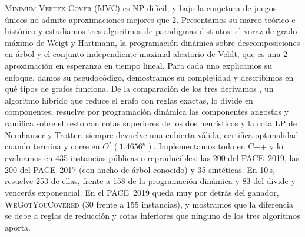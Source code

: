 \textsc{Minimum Vertex Cover} (MVC) es NP-difícil, y bajo la conjetura de juegos únicos no admite aproximaciones mejores que $2$. Presentamos su marco teórico e histórico y estudiamos tres algoritmos de paradigmas distintos: el voraz de grado máximo de Weigt y Hartmann, la programación dinámica sobre descomposiciones en árbol y el conjunto independiente maximal aleatorio de Veldt, que es una $2$-aproximación en esperanza en tiempo lineal. Para cada uno explicamos su enfoque, damos su pseudocódigo, demostramos su complejidad y describimos en qué tipos de grafos funciona. De la comparación de los tres derivamos \hyvc, un algoritmo híbrido que reduce el grafo con reglas exactas, lo divide en componentes, resuelve por programación dinámica las componentes angostas y ramifica sobre el resto con cotas superiores de los dos heurísticos y la cota LP de Nemhauser y Trotter. \hyvc{} siempre devuelve una cubierta válida, certifica optimalidad cuando termina y corre en $O^*(1.4656^n)$. Implementamos todo en C++ y lo evaluamos en 435 instancias públicas o reproducibles: las 200 del PACE~2019, las 200 del PACE~2017 (con ancho de árbol conocido) y 35 sintéticas. En 10\,s, \hyvc{} resuelve 253 de ellas, frente a 158 de la programación dinámica y 83 del divide y vencerás exponencial. En el PACE~2019 queda muy por detrás del ganador, \textsc{WeGotYouCovered} (30 frente a 155 instancias), y mostramos que la diferencia se debe a reglas de reducción y cotas inferiores que ninguno de los tres algoritmos aporta.
